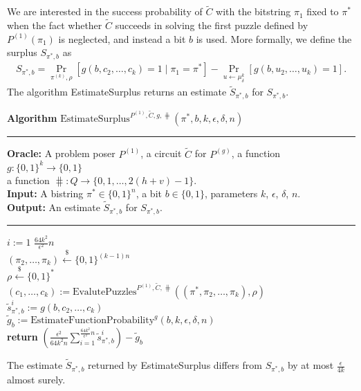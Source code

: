 We are interested in the success probability of $\widetilde{C}$ with the bitstring $\pi_1$ fixed to $\pi^*$ when
the fact whether $\widetilde{C}$ succeeds in solving the first puzzle defined by $P^{(1)}(\pi_1)$ is neglected, and
instead a bit $b$ is used. More formally, we define the surplus $S_{\pi^*, b}$ as
\begin{align}
  \label{eq:s_pi_b}
S_{\pi^*, b} = \underset{\pi^{(k)}, \rho}{\Pr}\left[g(b, c_2, \dots, c_k) = 1 \mid \pi_1 = \pi^*\right] - \underset{u \leftarrow \mu^{k}_{\delta}}{\Pr}\left[g(b, u_2, \dots, u_k) = 1\right].
\end{align}
%
The algorithm EstimateSurplus returns an estimate $\widetilde{S}_{\pi^*, b}$ for $S_{\pi^*, b}$.
%
\begin{codeblock}
  \textbf{Algorithm} $\text{EstimateSurplus}^{P^{(1)}, \widetilde{C}, g, \hash}(\pi^*, b, k, \epsilon, \delta, n)$
  \medskip
  \hrule
  \medskip
  \textbf{Oracle:} A problem poser $P^{(1)}$, a circuit $\widetilde{C}$ for $P^{(g)}$, a function $g: \{0,1\}^{k} \rightarrow \{0,1\}$ \\
  \IndII a function $\hash : Q \rightarrow \{0,1,\dots, 2(h+v)-1\}$.\\
  \textbf{Input:} A bistring $\pi^* \in \{0,1\}^{n}$, a bit $b \in \{0,1\}$, parameters $k$, $\epsilon$, $\delta$, $n$.\\
  \textbf{Output:} An estimate $\widetilde{S}_{\pi^*, b}$ for $S_{\pi^*, b}$.
  \medskip\hrule\medskip
  \For $i:=1$ \To $\frac{64k^2}{\epsilon^2}n$ \Do \\
  \IndI $(\pi_{2}, \dots, \pi_k) \xleftarrow{\$} \{0,1\}^{(k-1)n}$\\
  \IndI $\rho \xleftarrow{\$} \{0,1\}^{*}$\\
  \IndI $(c_1, \dots, c_k) := \text{EvalutePuzzles}^{P^{(1)}, \widetilde{C}, \hash}((\pi^*, \pi_2, \dots, \pi_k), \rho)$\\
  \IndI $\widetilde{s}_{\pi^*,b}^i := g(b, c_{2}, \dots, c_k)$\\
  $\widetilde{g}_b := \text{EstimateFunctionProbability}^{g}(b, k, \epsilon, \delta, n)$ \\
  \textbf{return} $\left(\frac{\epsilon^2}{64k^2n} \sum_{i=1}^{\frac{64k^2}{\epsilon^2} n} \widetilde{s}_{\pi^*,b}^i \right) - \widetilde{g}_b$\\
\end{codeblock}
%
\begin{lemma}
  \label{lemma:surplus_estimate}
The estimate $\widetilde{S}_{\pi^*,b}$ returned by EstimateSurplus differs from $S_{\pi^*, b}$ by at most $\frac{\epsilon}{4k}$ almost surely.
\end{lemma}

